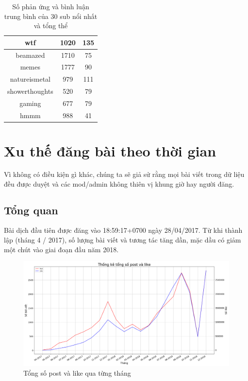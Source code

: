 \documentclass[10pt,a4paper]{article}
\begin{document}
\begin{table}[hp]
\begin{tabular}{|c|c|c|}
        \hline
        wtf & 1020 & 135 \\
        \hline
        beamazed & 1710 & 75 \\
        \hline
        memes & 1777 & 90 \\
        \hline
        natureismetal & 979 & 111 \\
        \hline
        showerthoughts & 520 & 79 \\
        \hline
        gaming & 677 & 79 \\
        \hline
        hmmm & 988 & 41 \\
        \hline
    \end{tabular} 
    \caption{Số phản ứng và bình luận trung bình của 30 sub nổi nhất và tổng thể}
    \label{tab:meaninterests}   
\end{table}

\section{Xu thế đăng bài theo thời gian}
Vì không có điều kiện gì khác, chúng ta sẽ giả sử rằng mọi bài viết trong dữ liệu đều được duyệt và các mod/admin không thiên vị khung giờ hay người đăng.

\subsection{Tổng quan}

Bài dịch đầu tiên được đăng vào 18:59:17+0700 ngày 28/04/2017. Từ khi thành lập (tháng 4 / 2017), số lượng bài viết và tương tác tăng dần, mặc dầu có giảm một chút vào giai đoạn đầu năm 2018. 
\begin{figure}[!h]
    \centering
    \includegraphics[width=\textwidth]{img/AllLikesPostsOverTime.png}
    \caption{Tổng số post và like qua từng tháng}
    \label{fig:alllikespostsovertime}
\end{figure}
\end{document}
